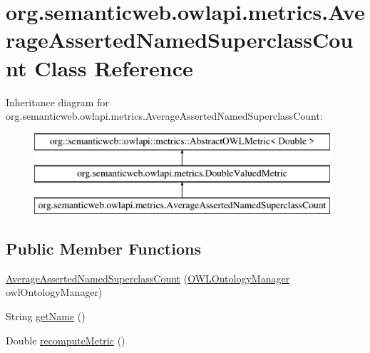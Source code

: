 \hypertarget{classorg_1_1semanticweb_1_1owlapi_1_1metrics_1_1_average_asserted_named_superclass_count}{\section{org.\-semanticweb.\-owlapi.\-metrics.\-Average\-Asserted\-Named\-Superclass\-Count Class Reference}
\label{classorg_1_1semanticweb_1_1owlapi_1_1metrics_1_1_average_asserted_named_superclass_count}
}
Inheritance diagram for org.\-semanticweb.\-owlapi.\-metrics.\-Average\-Asserted\-Named\-Superclass\-Count\-:\begin{figure}[H]
\begin{center}
\leavevmode
\includegraphics[height=3.000000cm]{classorg_1_1semanticweb_1_1owlapi_1_1metrics_1_1_average_asserted_named_superclass_count}
\end{center}
\end{figure}
\subsection*{Public Member Functions}
\begin{DoxyCompactItemize}
\item 
\hyperlink{classorg_1_1semanticweb_1_1owlapi_1_1metrics_1_1_average_asserted_named_superclass_count_a5c36c4b136f4f9311b3eaecbadb10656}{Average\-Asserted\-Named\-Superclass\-Count} (\hyperlink{interfaceorg_1_1semanticweb_1_1owlapi_1_1model_1_1_o_w_l_ontology_manager}{O\-W\-L\-Ontology\-Manager} owl\-Ontology\-Manager)
\item 
String \hyperlink{classorg_1_1semanticweb_1_1owlapi_1_1metrics_1_1_average_asserted_named_superclass_count_a5273800f412205c8ccc3ffcaf572a980}{get\-Name} ()
\item 
Double \hyperlink{classorg_1_1semanticweb_1_1owlapi_1_1metrics_1_1_average_asserted_named_superclass_count_aadef0fd73d4ca2c06df3107be22a044f}{recompute\-Metric} ()
\end{DoxyCompactItemize}
